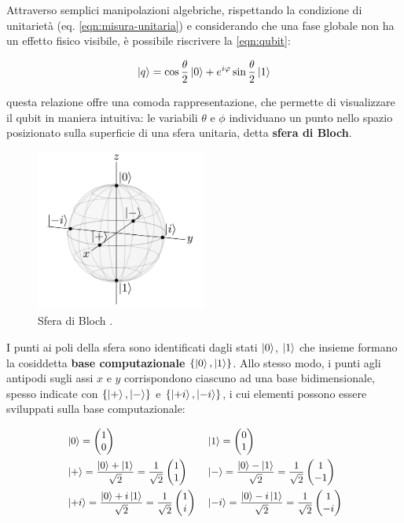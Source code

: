 Attraverso semplici manipolazioni algebriche, rispettando la condizione di unitarietà (eq. \ref{eqn:misura-unitaria}) e considerando che una fase globale non ha un effetto fisico visibile, è possibile riscrivere la \ref{eqn:qubit}:

\begin{equation}\label{eqn:bloch}
    \ket{q} = \cos \frac{\theta}{2} \ket{0} + e^{i\varphi} \sin \frac{\theta}{2} \ket{1}
\end{equation}

questa relazione offre una comoda rappresentazione, che permette di visualizzare il qubit in maniera intuitiva: le variabili $\theta$ e $\phi$ individuano un punto nello spazio posizionato sulla superficie di una sfera unitaria, detta \textbf{sfera di Bloch}.

\begin{figure}[H]
    \centering
    \includegraphics[width=0.5\textwidth]{Immagini/Capitolo_2/bloch.png}
    \caption{Sfera di Bloch \cite{Wong2022}.}
    \label{fig:sfera-di-Bloch}
\end{figure} 

I punti ai poli della sfera sono identificati dagli stati $\ket{0}$, $\ket{1}$ che insieme formano la cosiddetta \textbf{base computazionale} $\{\ket{0},\ket{1}\}$. Allo stesso modo, i punti agli antipodi sugli assi $x$ e $y$ corrispondono ciascuno ad una base bidimensionale, spesso indicate con $\{\ket{+},\ket{-}\}$ e $\{\ket{+i},\ket{-i}\}$, i cui elementi possono essere sviluppati sulla base computazionale:

\begin{subequations}\label{eqn:autostati-rotazioni}
\small
\begin{align}
    &\ket{0} = \vectorTwo{1}{0} &&\ket{1} = \vectorTwo{0}{1}\\
    &\ket{+} = \frac{\ket{0}+\ket{1}}{\sqrt{2}} = \frac{1}{\sqrt{2}} \vectorTwo{1}{1} 
    &&\ket{-} = \frac{\ket{0}-\ket{1}}{\sqrt{2}} = \frac{1}{\sqrt{2}} \vectorTwo{1}{-1}\\
    &\ket{+i} = \frac{\ket{0}+i\ket{1}}{\sqrt{2}} = \frac{1}{\sqrt{2}} \vectorTwo{1}{i} 
    &&\ket{-i} = \frac{\ket{0}-i\ket{1}}{\sqrt{2}} = \frac{1}{\sqrt{2}} \vectorTwo{1}{-i}
\end{align}
\end{subequations}

